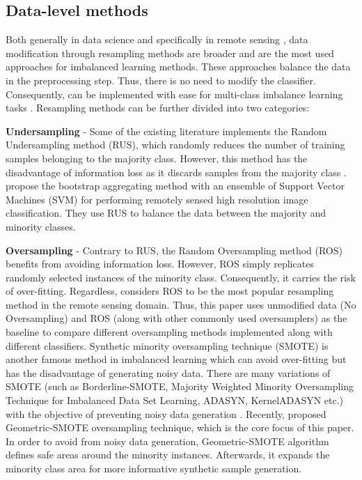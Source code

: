 \documentclass[parskip=full]{scrartcl}
\begin{document}
\subsection{Data-level methods}
Both generally in data science \cite{Douzas2019} and specifically in
remote sensing \cite{Feng2019}, data modification through resampling methods
are broader and are the most used approaches for imbalanced learning methods.
These approaches balance the data in the preprocessing step. Thus, there is
no need to modify the classifier. Consequently, can be implemented with ease
for multi-class imbalance learning tasks \cite{Feng2019}. Resampling methods
can be further divided into two categories:

\textbf{Undersampling} - Some of the existing literature implements the Random
Undersampling method (RUS), which randomly reduces the number of training
samples belonging to the majority class. However, this method has the
disadvantage of information loss as it discards samples from the majority class
\cite{Feng2019}. \cite{Waske2009} propose the bootstrap aggregating method with
an ensemble of Support Vector Machines (SVM) for performing remotely sensed
high resolution image classification. They use RUS to balance the data between
the majority and minority classes.

\textbf{Oversampling} - Contrary to RUS, the Random Oversampling method (ROS)
benefits from avoiding information loss. However, ROS simply replicates
randomly selected instances of the minority class. Consequently, it carries the 
risk of over-fitting. Regardless, \cite{Feng2019}
considers ROS to be the most popular resampling method in the remote sensing
domain. Thus, this paper uses unmodified data (No Oversampling) and ROS (along
with other commonly used oversamplers) as the baseline to compare different
oversampling methods implemented along with different classifiers. Synthetic
minority oversampling technique (SMOTE) is another famous method in imbalanced
learning which can avoid over-fitting but has the disadvantage of generating
noisy data. There are many variations of SMOTE (such as Borderline-SMOTE,
Majority Weighted Minority Oversampling Technique for Imbalanced Data Set
Learning, ADASYN, KernelADASYN etc.) with the objective of preventing noisy
data generation \cite{Feng2019}. Recently, \cite{Douzas2019}
proposed Geometric-SMOTE oversampling technique, which is the core focus of
this paper. In order to avoid from noisy data generation, Geometric-SMOTE
algorithm defines safe areas around the minority instances. Afterwards, it
expands the minority class area for more informative synthetic sample
generation.
\end{document}
